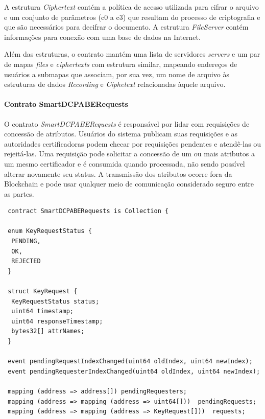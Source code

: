 \documentclass[a4paper,11pt]{article}
\begin{document}
A estrutura \emph{Ciphertext} contém a política de acesso utilizada para cifrar o arquivo e um conjunto de parâmetros (c0 a c3) que resultam do processo de criptografia e que são necessários para decifrar o documento.
A estrutura \emph{FileServer} contém informações para conexão com uma base de dados na Internet.

Além das estruturas, o contrato mantém uma lista de servidores \emph{servers} e um par de mapas \emph{files} e \emph{ciphertexts} com estrutura similar, mapeando endereços de usuários a submapas que associam, por sua vez, um nome de arquivo às estruturas de dados \emph{Recording} e \emph{Ciphetext} relacionadas àquele arquivo. %

\paragraph{Contrato SmartDCPABERequests}



O contrato \emph{SmartDCPABERequests}  é responsável por lidar com requisições de concessão de atributos.
Usuários do sistema publicam suas requisições e as autoridades certificadoras podem checar por requisições pendentes e atendê-las ou rejeitá-las.
Uma requisição pode solicitar a concessão de um ou mais atributos a um mesmo certificador e é consumida quando processada, não sendo possível alterar novamente seu status.
A transmissão dos atributos ocorre fora da Blockchain e pode usar qualquer meio de comunicação considerado seguro entre as partes.


\begin{lstlisting}
 contract SmartDCPABERequests is Collection {

 enum KeyRequestStatus {
  PENDING,
  OK,
  REJECTED
 }

 struct KeyRequest {
  KeyRequestStatus status;
  uint64 timestamp;
  uint64 responseTimestamp;
  bytes32[] attrNames;
 }

 event pendingRequestIndexChanged(uint64 oldIndex, uint64 newIndex);
 event pendingRequesterIndexChanged(uint64 oldIndex, uint64 newIndex);

 mapping (address => address[]) pendingRequesters;
 mapping (address => mapping (address => uint64[]))  pendingRequests;
 mapping (address => mapping (address => KeyRequest[]))  requests;
\end{lstlisting}
\end{document}
